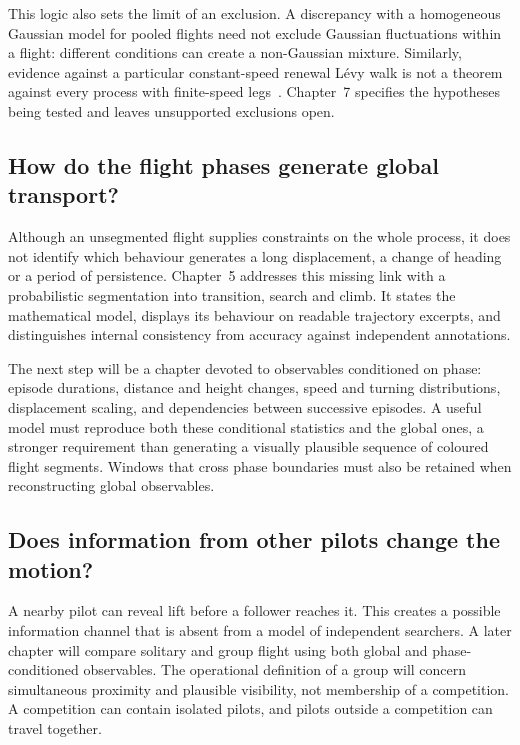 This logic also sets the limit of an exclusion. A discrepancy with a homogeneous Gaussian
model for pooled flights need not exclude Gaussian fluctuations within a flight: different
conditions can create a non-Gaussian mixture. Similarly, evidence against a particular
constant-speed renewal L\'evy walk is not a theorem against every process with finite-speed
legs~\cite{zaburdaev2015}. Chapter~7 specifies the hypotheses being tested and
leaves unsupported exclusions open.

\subsection{How do the flight phases generate global transport?}

Although an unsegmented flight supplies constraints on the whole process, it does not
identify which behaviour generates a long displacement, a change of heading or a period
of persistence.
Chapter~5 addresses this missing link with a probabilistic segmentation into
transition, search and climb. It states the mathematical model, displays its behaviour on
readable trajectory excerpts, and distinguishes internal consistency from accuracy against
independent annotations.

The next step will be a chapter devoted to observables conditioned on phase: episode
durations, distance and height changes, speed and turning distributions, displacement
scaling, and dependencies between successive episodes. A useful model must reproduce both
these conditional statistics and the global ones, a stronger requirement than generating
a visually plausible sequence of coloured flight segments. Windows that cross
phase boundaries must also be retained when reconstructing global observables.

\subsection{Does information from other pilots change the motion?}

A nearby pilot can reveal lift before a follower reaches it. This creates a possible
information channel that is absent from a model of independent searchers. A later chapter
will compare solitary and group flight using both global and phase-conditioned observables.
The operational definition of a group will concern simultaneous proximity and plausible
visibility, not membership of a competition. A competition can contain isolated pilots,
and pilots outside a competition can travel together.

